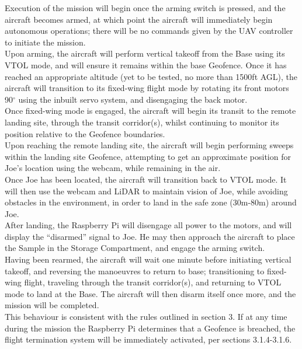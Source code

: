 Execution of the mission will begin once the arming switch is pressed, and the aircraft becomes armed, at which point the aircraft will immediately begin autonomous operations; there will be no commands given by the UAV controller to initiate the mission.\\

Upon arming, the aircraft will perform vertical takeoff from the Base using its VTOL mode, and will ensure it remains within the base Geofence. Once it has reached an appropriate altitude (yet to be tested, no more than 1500ft AGL), the aircraft will transition to its fixed-wing flight mode by rotating its front motors 90$^\circ$ using the inbuilt servo system, and disengaging the back motor.\\

Once fixed-wing mode is engaged, the aircraft will begin its transit to the remote landing site, through the transit corridor(s), whilst continuing to monitor its position relative to the Geofence boundaries.\\

Upon reaching the remote landing site, the aircraft will begin performing sweeps within the landing site Geofence, attempting to get an approximate position for Joe's location using the webcam, while remaining in the air.\\

Once Joe has been located, the aircraft will transition back to VTOL mode. It will then use the webcam and LiDAR to maintain vision of Joe, while avoiding obstacles in the environment, in order to land in the safe zone (30m-80m) around Joe.\\

After landing, the Raspberry Pi will disengage all power to the motors, and will display the ``disarmed'' signal to Joe. He may then approach the aircraft to place the Sample in the Storage Compartment, and engage the arming switch.\\

Having been rearmed, the aircraft will wait one minute before initiating vertical takeoff, and reversing the manoeuvres to return to base; transitioning to fixed-wing flight, traveling through the transit corridor(s), and returning to VTOL mode to land at the Base. The aircraft will then disarm itself once more, and the mission will be completed.\\

This behaviour is consistent with the rules outlined in section 3. If at any time during the mission the Raspberry Pi determines that a Geofence is breached, the flight termination system will be immediately activated, per sections 3.1.4-3.1.6.
